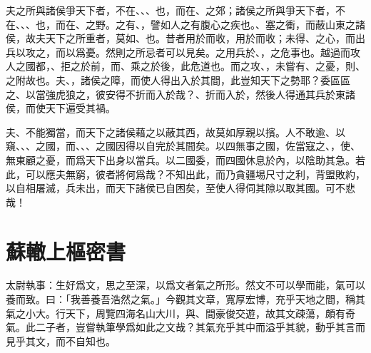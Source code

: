 夫之所與諸侯爭天下者，不在、、、也，而在、之郊；諸侯之所與爭天下者，不在、、、也，而在、之野。之有、，譬如人之有腹心之疾也。、塞之衝，而蔽山東之諸侯，故夫天下之所重者，莫如、也。昔者用於而收，用於而收；未得、之心，而出兵以攻之，而以爲憂。然則之所忌者可{以}見矣。之用兵於、，之危事也。越過而攻人之國都，、拒之於前，而、乘之於後，此危道也。而之攻、，未嘗有、之憂，則、之附故也。夫、，諸侯之障，而使人得出入於其間，此豈知天下之勢耶？委區區之、以當強虎狼之，彼安得不折而入於哉？、折而入於，然後人得通其兵於東諸侯，而使天下{遍}受其禍。%

夫、不能獨當，而天下之諸侯藉之以蔽其西，故莫如厚親以擯。人不敢逾、以窺、、、之國，而、、、之國因得以自完於其間矣。以四無事之國，佐當寇之、，使、無東顧之憂，而爲天下出身以當兵。以二國委，而四國休息於內，以陰助其急。若此，可以應夫無窮，彼者將何爲哉？不知出此，而乃貪疆埸尺寸之利，背盟敗約，以自相屠滅，兵未出，而天下諸侯已自困矣，至{使}人得伺其隙以取其國。可不悲哉！%

\theendnotes

\section[上樞密韓太尉書\quad{\small 蘇轍}]{{\normalsize 蘇轍}\quad 上樞密書}
太尉執事：生好爲文，思之至深，以爲文者氣之所形。然文不可以學而能，氣可以養而致。曰：「我善養吾浩然之氣。」今觀其文章，寬厚宏博，充乎天地之間，稱其氣之小大。行天下，周覽四海名山大川，與、間豪俊交{遊}，故其文疎蕩，頗有奇氣。此二子者，豈嘗執筆學爲如此之文哉？其氣充乎其中而溢乎其貌，動乎其言而見乎其文，而不自知也。%

